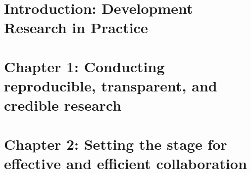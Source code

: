 %
%
%
%




\cleardoublepage
\chapter{Introduction: Development Research in Practice}





\chapter{Chapter 1: Conducting reproducible, transparent, and credible research}
\label{ch:1}




\chapter{Chapter 2: Setting the stage for effective and efficient collaboration}
\label{ch:2}





